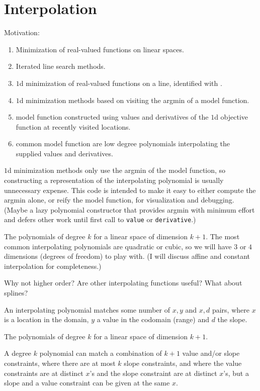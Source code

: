 \chapter{Interpolation}\label{ch:Interpolation}

Motivation: 
\begin{enumerate}
 \item Minimization of real-valued functions on linear spaces.
 \item Iterated line search methods.
 \item $1$d minimization of real-valued functions on a line,
 identified with .
 \item $1$d minimization methods based on visiting the
 argmin of a model function.
 \item model function constructed using values and derivatives
 of the $1$d objective function at recently visited locations.
 \item common model function are low degree polynomials 
 interpolating the supplied values and derivatives.
\end{enumerate}

$1$d minimization methods only use the argmin of the model 
function, so constructing a representation of the interpolating 
polynomial is usually unnecessary expense.
This code is intended to make it easy to either 
compute the argmin alone,
or reify the model function, for visualization and debugging.
(Maybe a lazy polynomial constructor that provides argmin with
minimum effort and defers other work until first call to 
\texttt{value} or \texttt{derivative}.)

The polynomials of degree $k$ for a linear space of dimension
$k+1$.
The most common interpolating polynomials are quadratic or cubic,
so we will have $3$ or $4$ dimensions (degrees of freedom) to play
with. 
(I will discuss affine and constant interpolation for 
completeness.)

Why not higher order? Are other interpolating functions useful?
What about splines?

An interpolating polynomial matches some number of $x,y$
and $x,d$ pairs, where $x$ is a location in the domain,
$y$ a value in the codomain (range) and $d$ the slope.

The polynomials of degree $k$ for a linear space of dimension
$k+1$. 

A degree $k$ polynomial can match a combination of $k+1$ value 
and/or 
slope constraints, where there are at most $k$ slope constraints,
and where the value constraints are at distinct $x$'s and the
slope constraint are at distinct $x$'s, but a slope and a value 
constraint can be given at the same $x$.

